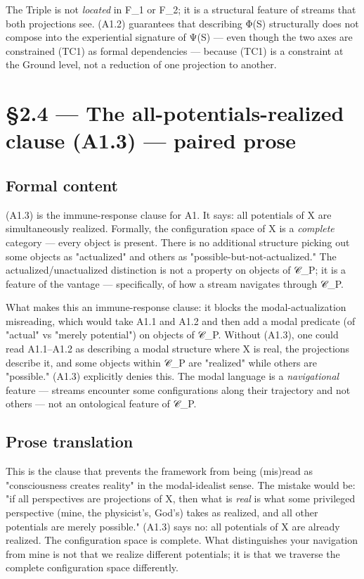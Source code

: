 \documentclass[11pt, openany]{book}
\newcommand{\sectionbreak}{\clearpage}
\begin{document}
The Triple is not \textit{located} in F\_\allowbreak{}1 or F\_\allowbreak{}2; it is a structural feature of streams that both projections see. (A1.2) guarantees that describing Φ(S) structurally does not compose into the experiential signature of Ψ(S) --- even though the two axes are constrained (TC1) as formal dependencies --- because (TC1) is a constraint at the Ground level, not a reduction of one projection to another.

\sectionbreak

\section{§2.4 --- The all-potentials-realized clause (A1.3) --- paired prose}

\subsection{Formal content}

(A1.3) is the immune-response clause for A1. It says: all potentials of X are simultaneously realized. Formally, the configuration space of X is a \textit{complete} category --- every object is present. There is no additional structure picking out some objects as "actualized" and others as "possible-but-not-actualized." The actualized/unactualized distinction is not a property on objects of 𝒞\_\allowbreak{}P; it is a feature of the vantage --- specifically, of how a stream navigates through 𝒞\_\allowbreak{}P.

What makes this an immune-response clause: it blocks the modal-actualization misreading, which would take A1.1 and A1.2 and then add a modal predicate (of "actual" vs "merely potential") on objects of 𝒞\_\allowbreak{}P. Without (A1.3), one could read A1.1–A1.2 as describing a modal structure where X is real, the projections describe it, and some objects within 𝒞\_\allowbreak{}P are "realized" while others are "possible." (A1.3) explicitly denies this. The modal language is a \textit{navigational} feature --- streams encounter some configurations along their trajectory and not others --- not an ontological feature of 𝒞\_\allowbreak{}P.

\subsection{Prose translation}

This is the clause that prevents the framework from being (mis)read as "consciousness creates reality" in the modal-idealist sense. The mistake would be: "if all perspectives are projections of X, then what is \textit{real} is what some privileged perspective (mine, the physicist's, God's) takes as realized, and all other potentials are merely possible." (A1.3) says no: all potentials of X are already realized. The configuration space is complete. What distinguishes your navigation from mine is not that we realize different potentials; it is that we traverse the complete configuration space differently.
\end{document}
